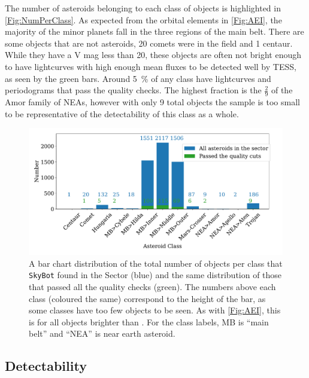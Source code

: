 \documentclass{UCreport}
\begin{document}
The number of asteroids belonging to each class of objects is highlighted in \autoref{Fig:NumPerClass}.
As expected from the orbital elements in \autoref{Fig:AEI}, the majority of the minor planets fall in the three regions of the main belt.
There are some objects that are not asteroids, 20 comets were in the field and 1 centaur.
While they have a V mag less than 20, these objects are often not bright enough to have lightcurves with high enough mean fluxes to be detected well by TESS, as seen by the green bars.
Around \qty{5}{\percent} of any class have lightcurves and periodograms that pass the quality checks.
The highest fraction is the $\frac29$ of the Amor family of NEAs, however with only 9 total objects the sample is too small to be representative of the detectability of this class as a whole.


\begin{figure}
  \centering
  \includegraphics[width=\textwidth]{../OzData/classesBarqualCut.pdf}
  \caption[Class distribution]{A bar chart distribution of the total number of objects per class that \texttt{SkyBot} found in the Sector (blue) and the same distribution of those that passed all the quality checks (green).
    The numbers above each class (coloured the same) correspond to the height of the bar, as some classes have too few objects to be seen.
    As with \autoref{Fig:AEI}, this is for all objects brighter than \unit{\mag}.
    For the class labels, MB is ``main belt'' and ``NEA'' is near earth asteroid.}
  \label{Fig:NumPerClass}
\end{figure}

\subsection{Detectability}
\end{document}
